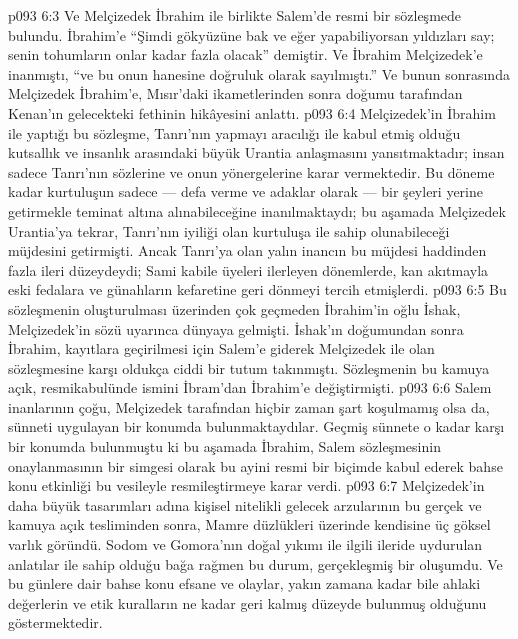 \vs p093 6:3 Ve Melçizedek İbrahim ile birlikte Salem’de resmi bir sözleşmede bulundu. İbrahim’e “Şimdi gökyüzüne bak ve eğer yapabiliyorsan yıldızları say; senin tohumların onlar kadar fazla olacak” demiştir. Ve İbrahim Melçizedek’e inanmıştı, “ve bu onun hanesine doğruluk olarak sayılmıştı.” Ve bunun sonrasında Melçizedek İbrahim’e, Mısır’daki ikametlerinden sonra doğumu tarafından Kenan’ın gelecekteki fethinin hikâyesini anlattı.
\vs p093 6:4 Melçizedek’in İbrahim ile yaptığı bu sözleşme, Tanrı’nın yapmayı aracılığı ile kabul etmiş olduğu kutsallık ve insanlık arasındaki büyük Urantia anlaşmasını yansıtmaktadır; insan sadece Tanrı’nın sözlerine ve onun yönergelerine  karar vermektedir. Bu döneme kadar kurtuluşun sadece --- defa verme ve adaklar olarak --- bir şeyleri yerine getirmekle teminat altına alınabileceğine inanılmaktaydı; bu aşamada Melçizedek Urantia’ya tekrar, Tanrı’nın iyiliği olan kurtuluşa  ile sahip olunabileceği müjdesini getirmişti. Ancak Tanrı’ya olan yalın inancın bu müjdesi haddinden fazla ileri düzeydeydi; Sami kabile üyeleri ilerleyen dönemlerde, kan akıtmayla eski fedalara ve günahların kefaretine geri dönmeyi tercih etmişlerdi.
\vs p093 6:5 Bu sözleşmenin oluşturulması üzerinden çok geçmeden İbrahim’in oğlu İshak, Melçizedek’in sözü uyarınca dünyaya gelmişti. İshak’ın doğumundan sonra İbrahim, kayıtlara geçirilmesi için Salem’e giderek Melçizedek ile olan sözleşmesine karşı oldukça ciddi bir tutum takınmıştı. Sözleşmenin bu kamuya açık, resmikabulünde ismini İbram’dan İbrahim’e değiştirmişti.
\vs p093 6:6 Salem inanlarının çoğu, Melçizedek tarafından hiçbir zaman şart koşulmamış olsa da, sünneti uygulayan bir konumda bulunmaktaydılar. Geçmiş sünnete o kadar karşı bir konumda bulunmuştu ki bu aşamada İbrahim, Salem sözleşmesinin onaylanmasının bir simgesi olarak bu ayini resmi bir biçimde kabul ederek bahse konu etkinliği bu vesileyle resmileştirmeye karar verdi.
\vs p093 6:7 Melçizedek’in daha büyük tasarımları adına kişisel nitelikli gelecek arzularının bu gerçek ve kamuya açık tesliminden sonra, Mamre düzlükleri üzerinde kendisine üç göksel varlık göründü. Sodom ve Gomora’nın doğal yıkımı ile ilgili ileride uydurulan anlatılar ile sahip olduğu bağa rağmen bu durum, gerçekleşmiş bir oluşumdu. Ve bu günlere dair bahse konu efsane ve olaylar, yakın zamana kadar bile ahlaki değerlerin ve etik kuralların ne kadar geri kalmış düzeyde bulunmuş olduğunu göstermektedir.
